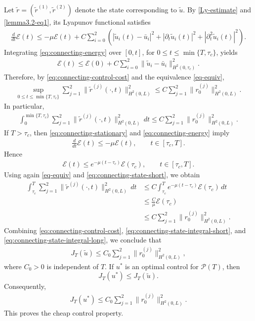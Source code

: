 \documentclass[12pt]{article}
\numberwithin{equation}{section}
\begin{document}
Let $\widetilde r=(\widetilde r^{(1)},\widetilde r^{(2)})$ denote
the state corresponding to $\widetilde u$. By
\eqref{Ly-estimate} and \eqref{lemma3.2-eq1}, its Lyapunov
functional satisfies
\begin{align}
\frac{d}{dt}\mathcal E(t)
\leq
-\mu\mathcal E(t)
+
C\sum_{i=0}^2
\left(
|\widetilde u_i(t)-\bar u_i|^2
+
|\partial_t\widetilde u_i(t)|^2
+
|\partial_t^2\widetilde u_i(t)|^2
\right).
\label{eq:connecting-energy}
\end{align}
Integrating \eqref{eq:connecting-energy} over
$[0,t]$, for $0\leq t\leq\min\{T,\tau_c\}$, yields
\begin{align}
\mathcal E(t)
\leq
\mathcal E(0)
+
C\sum_{i=0}^2
\|\widetilde u_i-\bar u_i\|_{H^2(0,\tau_c)}^2.
\end{align}
Therefore, by \eqref{eq:connecting-control-cost} and the equivalence
\eqref{eq-equiv},
\begin{align}
\sup_{0\leq t\leq\min\{T,\tau_c\}}
\sum_{j=1}^2
\|\widetilde r^{(j)}(\cdot,t)\|_{H^2(0,L)}^2
\leq
C
\sum_{j=1}^2
\|r_0^{(j)}\|_{H^2(0,L)}^2.
\label{eq:connecting-state-short}
\end{align}
In particular,
\begin{align}
\int_0^{\min\{T,\tau_c\}}
\sum_{j=1}^2
\|\widetilde r^{(j)}(\cdot,t)\|_{H^2(0,L)}^2\,dt
\leq
C
\sum_{j=1}^2
\|r_0^{(j)}\|_{H^2(0,L)}^2.
\label{eq:connecting-state-integral-short}
\end{align}
If $T>\tau_c$, then \eqref{eq:connecting-stationary} and
\eqref{eq:connecting-energy} imply
\begin{align}
\frac{d}{dt}\mathcal E(t)
\leq
-\mu\mathcal E(t),
\qquad
t\in[\tau_c,T].
\end{align}
Hence
\begin{align}
\mathcal E(t)
\leq
e^{-\mu(t-\tau_c)}\mathcal E(\tau_c),
\qquad
t\in[\tau_c,T].
\label{eq:connecting-decay}
\end{align}
Using again \eqref{eq-equiv} and
\eqref{eq:connecting-state-short}, we obtain
\begin{align}
\int_{\tau_c}^T
\sum_{j=1}^2
\|\widetilde r^{(j)}(\cdot,t)\|_{H^2(0,L)}^2\,dt
&\leq
C\int_{\tau_c}^T
e^{-\mu(t-\tau_c)}\mathcal E(\tau_c)\,dt
\nonumber\\
&\leq
\frac{C}{\mu}\mathcal E(\tau_c)
\nonumber\\
&\leq
C
\sum_{j=1}^2
\|r_0^{(j)}\|_{H^2(0,L)}^2.
\label{eq:connecting-state-integral-long}
\end{align}
Combining \eqref{eq:connecting-control-cost},
\eqref{eq:connecting-state-integral-short}, and
\eqref{eq:connecting-state-integral-long}, we conclude that
\begin{align}
J_T(\widetilde u)
\leq
C_0
\sum_{j=1}^2
\|r_0^{(j)}\|_{H^2(0,L)}^2,
\label{eq:comparison-cost}
\end{align}
where $C_0>0$ is independent of $T$. If $u^*$ is an optimal
control for $\mathcal P(T)$, then
\[
J_T(u^*)
\leq
J_T(\widetilde u).
\]
Consequently,
\begin{align}
J_T(u^*)
\leq
C_0
\sum_{j=1}^2
\|r_0^{(j)}\|_{H^2(0,L)}^2.
\end{align}
This proves the cheap control property.
\end{document}
